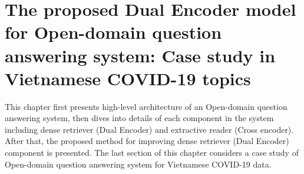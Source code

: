 \documentclass[12pt, sort&compress]{report}
\begin{document}
\chapter{The proposed Dual Encoder model for Open-domain question answering system: Case study in Vietnamese COVID-19 topics}
\label{chap:03}
This chapter first presents high-level architecture of an Open-domain question answering system, then dives into details of each component in the system including dense retriever (Dual Encoder) and extractive reader (Cross encoder). After that, the proposed method for improving dense retriever (Dual Encoder) component is presented. The last section of this chapter considers a case study of Open-domain question answering system for Vietnamese COVID-19 data.
\end{document}
